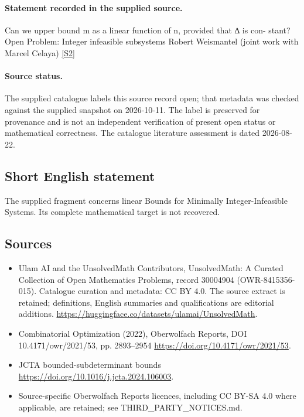 \documentclass[11pt]{article}
\newcommand{\sref}[2]{\hyperlink{source:#1:#2}{[S#2]}}
\begin{document}
\paragraph{Statement recorded in the supplied source.}
Can we upper bound m as a linear function of n, provided that ∆ is con- stant? Open Problem: Integer infeasible subsystems Robert Weismantel (joint work with Marcel Celaya) \sref{30004904}{2}
\paragraph{Source status.}
The supplied catalogue labels this source record open; that metadata was checked against the supplied snapshot on 2026-10-11. The label is preserved for provenance and is not an independent verification of present open status or mathematical correctness. The catalogue literature assessment is dated 2026-08-22.
\subsection{Short English statement}
The supplied fragment concerns linear Bounds for Minimally Integer-Infeasible Systems. Its complete mathematical target is not recovered.
\subsection{Sources}
\begin{itemize}
\item[\hypertarget{source:30004904:1}{S1}] Ulam AI and the UnsolvedMath Contributors, UnsolvedMath: A Curated Collection of Open Mathematics Problems, record 30004904 (OWR-8415356-015). Catalogue curation and metadata: CC BY 4.0. The source extract is retained; definitions, English summaries and qualifications are editorial additions.
\url{https://huggingface.co/datasets/ulamai/UnsolvedMath}.
\item[\hypertarget{source:30004904:2}{S2}] Combinatorial Optimization (2022), Oberwolfach Reports, DOI 10.4171/owr/2021/53, pp. 2893--2954
\url{https://doi.org/10.4171/owr/2021/53}.
\item[\hypertarget{source:30004904:3}{S3}] JCTA bounded-subdeterminant bounds
\url{https://doi.org/10.1016/j.jcta.2024.106003}.
\item Source-specific Oberwolfach Reports licences, including CC BY-SA 4.0 where applicable, are retained; see THIRD\_PARTY\_NOTICES.md.
\end{itemize}
\end{document}
